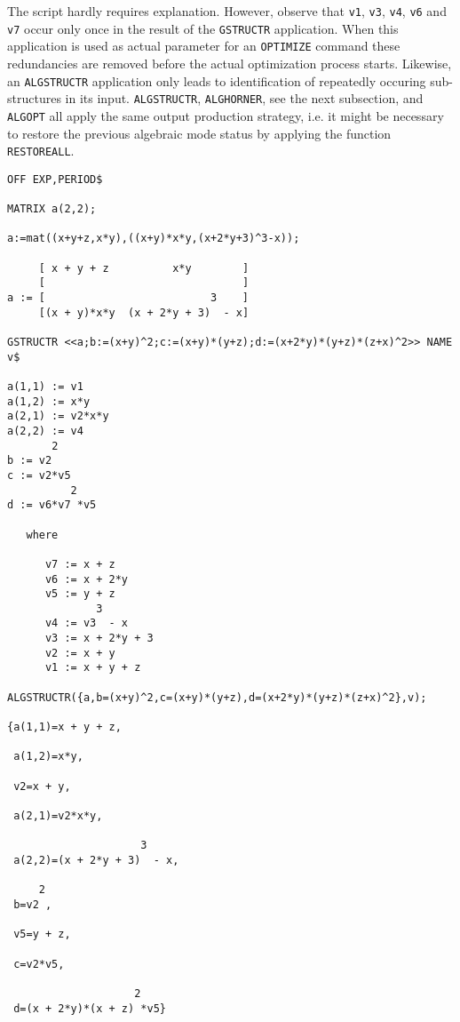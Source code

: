 The script hardly requires explanation. However, observe
that {\tt v1}, {\tt v3}, {\tt v4}, {\tt v6} and {\tt v7} occur only once
in the result of the {\tt GSTRUCTR} application. When this application
is used as actual parameter for an {\tt OPTIMIZE} command
these redundancies are removed before the actual optimization process starts.
Likewise,
an {\tt ALGSTRUCTR} application only leads to identification of repeatedly
occuring sub-structures in its input.
{\tt ALGSTRUCTR}, {\tt ALGHORNER}, see the next subsection, and {\tt ALGOPT}
all apply the same output production strategy, i.e. it might be necessary to
restore the previous algebraic mode status by applying the
function {\tt RESTOREALL}.
{\small
\begin{verbatim}
OFF EXP,PERIOD$

MATRIX a(2,2);

a:=mat((x+y+z,x*y),((x+y)*x*y,(x+2*y+3)^3-x));

     [ x + y + z          x*y        ]
     [                               ]
a := [                          3    ]
     [(x + y)*x*y  (x + 2*y + 3)  - x]

GSTRUCTR <<a;b:=(x+y)^2;c:=(x+y)*(y+z);d:=(x+2*y)*(y+z)*(z+x)^2>> NAME v$

a(1,1) := v1
a(1,2) := x*y
a(2,1) := v2*x*y
a(2,2) := v4
       2
b := v2
c := v2*v5
          2
d := v6*v7 *v5

   where

      v7 := x + z
      v6 := x + 2*y
      v5 := y + z
              3
      v4 := v3  - x
      v3 := x + 2*y + 3
      v2 := x + y
      v1 := x + y + z

ALGSTRUCTR({a,b=(x+y)^2,c=(x+y)*(y+z),d=(x+2*y)*(y+z)*(z+x)^2},v);

{a(1,1)=x + y + z,

 a(1,2)=x*y,

 v2=x + y,

 a(2,1)=v2*x*y,

                     3
 a(2,2)=(x + 2*y + 3)  - x,

     2
 b=v2 ,

 v5=y + z,

 c=v2*v5,

                    2
 d=(x + 2*y)*(x + z) *v5}
\end{verbatim}}
